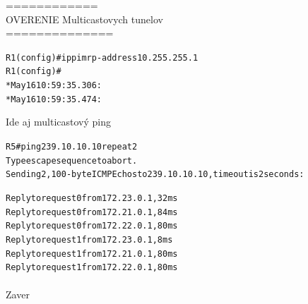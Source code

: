 \documentclass[12pt,twoside,a4paper]{report}
\begin{document}
============\\
OVERENIE Multicastovych tunelov\\
==============\\
\noindent
{\selectfont
\begin{small}
\begin{alltt}
R1(config)#ip pim rp-address 10.255.255.1
R1(config)#
*May 16 10:59:35.306: %
*May 16 10:59:35.474: %
\end{alltt}
\end{small}
}

Ide aj multicastový ping

\noindent
{\selectfont
\begin{small}
\begin{alltt}
R5#ping 239.10.10.10 repeat 2 
Type escape sequence to abort.
Sending 2, 100-byte ICMP Echos to 239.10.10.10, timeout is 2 seconds:

Reply to request 0 from 172.23.0.1, 32 ms
Reply to request 0 from 172.21.0.1, 84 ms
Reply to request 0 from 172.22.0.1, 80 ms
Reply to request 1 from 172.23.0.1, 8 ms
Reply to request 1 from 172.21.0.1, 80 ms
Reply to request 1 from 172.22.0.1, 80 ms
\end{alltt}
\end{small}
}

\paragraph{}
Zaver
\end{document}
